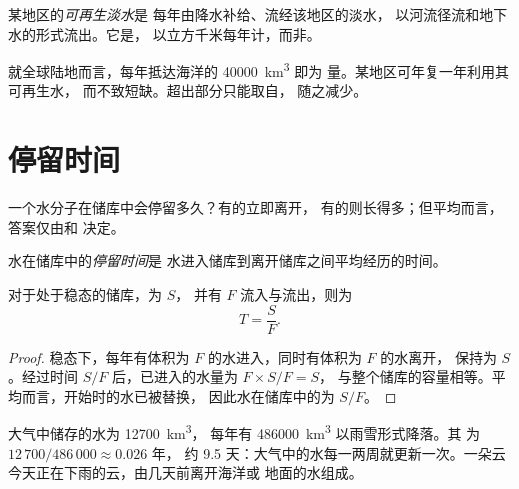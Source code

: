 \begin{definition}[可再生淡水]\label{def:g10:freshwater-resources:renewable}
某地区的\emph{可再生淡水}是
每年由降水补给、流经该地区的淡水，
以河流径流和地下水的形式流出。它是，
以立方千米每年计，而非。
\end{definition}

就全球陆地而言，每年抵达海洋的 \num{40000}~\unit{km^3} 即为
量。某地区可年复一年利用其可再生水，
而不致短缺。超出部分只能取自，
随之减少。

\section{停留时间}

一个水分子在储库中会停留多久？有的立即离开，
有的则长得多；但平均而言，答案仅由和
决定。

\begin{definition}[停留时间]\label{def:g10:freshwater-resources:residence-time}
水在储库中的\emph{停留时间}是
水进入储库到离开储库之间平均经历的时间。
\end{definition}

\begin{proposition}\label{prop:g10:freshwater-resources:residence}
对于处于稳态的储库，为 $S$，
并有 $F$ 流入与流出，则为
\[
T = \frac{S}{F}.
\]
\end{proposition}

\begin{proof}
稳态下，每年有体积为 $F$ 的水进入，同时有体积为 $F$ 的水离开，
保持为 $S$。经过时间 $S/F$ 后，已进入的水量为 $F \times S/F = S$，
与整个储库的容量相等。平均而言，开始时的水已被替换，
因此水在储库中的为 $S/F$。
\end{proof}

\begin{example}[空气中的水]\label{ex:g10:freshwater-resources:atmosphere}
大气中储存的水为 \num{12700}~\unit{km^3}，
每年有 \num{486000}~\unit{km^3} 以雨雪形式降落。其
为 $12\,700/486\,000 \approx \num{0.026}$ 年，
约 \num{9.5} 天：大气中的水每一两周就更新一次。一朵云
今天正在下雨的云，由几天前离开海洋或
地面的水组成。
\end{example}

